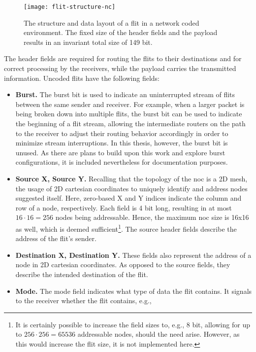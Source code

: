 \begin{figure}
    \centering
    \texttt{[image: flit-structure-nc]}
    \caption[The structure of a flit with network coding]{The structure and data layout of a flit in a network coded environment. The fixed size of
    the header fields and the payload results in an invariant total size of 149 bit.}
    \label{fig:flitstructurenetworkcoded}
\end{figure}

The header fields are required for routing the flits to their destinations and for correct processing by the receivers, while the payload carries the
transmitted information. Uncoded flits have the following fields:
\begin{itemize}
    \item \textbf{Burst.} The burst bit is used to indicate an uninterrupted stream of flits between the same sender and receiver. For example, when a
        larger packet is being broken down into multiple flits, the burst bit can be used to indicate the beginning of a flit stream, allowing the
        intermediate routers on the path to the receiver to adjust their routing behavior accordingly in order to minimize stream interruptions. In
        this thesis, however, the burst bit is unused. As there are plans to build upon this work and explore burst configurations, it is included
        nevertheless for documentation purposes.
    \item \textbf{Source X, Source Y.} Recalling that the topology of the \gls{noc} is a 2D mesh, the usage of 2D cartesian coordinates to uniquely
        identify and address nodes suggested itself. Here, zero-based X and Y indices indicate the column and row of a node, respectively. Each field is 4 bit long,
        resulting in at most $16 \cdot 16 = 256$ nodes being addressable. Hence, the maximum \gls{noc} size is 16x16 as well, which is deemed
        sufficient\footnote{It is certainly possible to increase the field sizes to, e.g., 8 bit, allowing for up to $256 \cdot 256 = 65536$ addressable
        nodes, should the need arise. However, as this would increase the flit size, it is not implemented here.}. The source header fields describe
        the address of the flit's sender.
    \item \textbf{Destination X, Destination Y.} These fields also represent the address of a node in 2D cartesian coordinates. As opposed to the
        source fields, they describe the intended destination of the flit.
    \item \textbf{Mode.} The mode field indicates what type of data the flit contains. It signals to the receiver whether the flit contains, e.g.,

\end{itemize}
